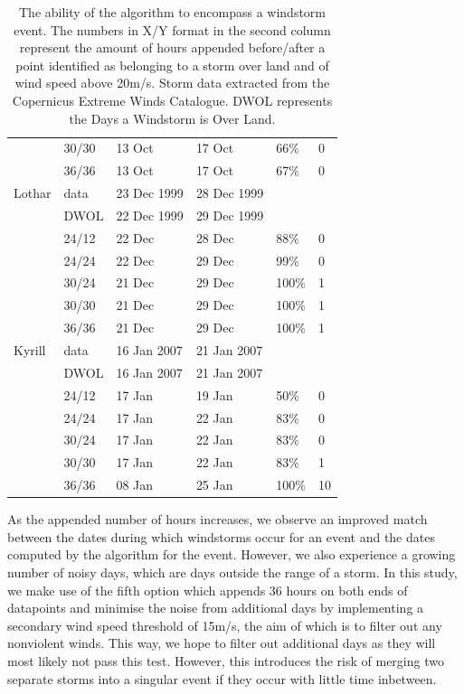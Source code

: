 \begin{table}
{\begin{tabular}{llllll}
                    & 30/30 & 13 Oct      & 17 Oct      & 66\%  & 0          \\
                    & 36/36 & 13 Oct      & 17 Oct      & 67\%  & 0          \\ \hline
        Lothar      & data  & 23 Dec 1999 & 28 Dec 1999 &       &            \\
                    & DWOL  & 22 Dec 1999 & 29 Dec 1999 &       &            \\
                    & 24/12 & 22 Dec      & 28 Dec      & 88\%  & 0          \\
                    & 24/24 & 22 Dec      & 29 Dec      & 99\%  & 0          \\
                    & 30/24 & 21 Dec      & 29 Dec      & 100\% & 1          \\
                    & 30/30 & 21 Dec      & 29 Dec      & 100\% & 1          \\
                    & 36/36 & 21 Dec      & 29 Dec      & 100\% & 1          \\ \hline
        Kyrill      & data  & 16 Jan 2007 & 21 Jan 2007 &       &            \\
                    & DWOL  & 16 Jan 2007 & 21 Jan 2007 &       &            \\
                    & 24/12 & 17 Jan      & 19 Jan      & 50\%  & 0          \\
                    & 24/24 & 17 Jan      & 22 Jan      & 83\%  & 0          \\
                    & 30/24 & 17 Jan      & 22 Jan      & 83\%  & 0          \\
                    & 30/30 & 17 Jan      & 22 Jan      & 83\%  & 1          \\
                    & 36/36 & 08 Jan      & 25 Jan      & 100\% & 10        
        \end{tabular}%
        }
        \caption{The ability of the algorithm to encompass a windstorm event. The numbers in X/Y format in the second column represent the amount of hours appended before/after a point identified as belonging to a storm over land and of wind speed above 20m/s. Storm data extracted from the Copernicus Extreme Winds Catalogue. DWOL represents the Days a Windstorm is Over Land.}
        \label{tab:stormcat}
        \end{table}

    As the appended number of hours increases, we observe an improved match between the dates during which windstorms occur for an event and the dates computed by the algorithm for the event. However, we also experience a growing number of noisy days, which are days outside the range of a storm. In this study, we make use of the fifth option which appends 36 hours on both ends of datapoints and minimise the noise from additional days by implementing a secondary wind speed threshold of 15m/s, the aim of which is to filter out any nonviolent winds. This way, we hope to filter out additional days as they will most likely not pass this test. However, this introduces the risk of merging two separate storms into a singular event if they occur with little time inbetween.

